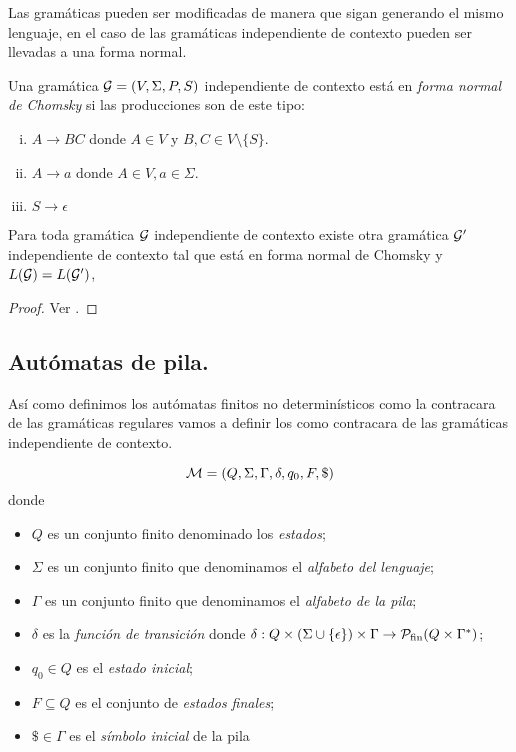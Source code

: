 \documentclass[tesis.tex]{subfiles}
\begin{document}
Las gramáticas pueden ser modificadas de manera que sigan generando el mismo lenguaje, en el caso de las gramáticas independiente de contexto pueden ser llevadas a una forma normal.

\begin{deff}
	Una gramática ${\cal G} = (V, \Sigma, P, S)$ independiente de contexto está en \emph{forma normal de Chomsky} si las producciones son de este tipo:
	\begin{enumerate}[i)]
		\item $A \to BC$ donde $A\in V$ y $B,C \in V \setminus \{ S \}$.
		\item $A \to a$ donde $A \in V, a \in \Sigma$.
		\item $S \to \epsilon$ 
	\end{enumerate}
\end{deff}

\begin{prop}\label{prop_fn_Chomsky}
	Para toda gramática $\cal G$ independiente de contexto existe otra gramática $\cal G'$ independiente de contexto tal que está en forma normal de Chomsky y $L({\cal G}) = L(\cal G')$,
\end{prop}

\begin{proof}
	Ver \cite[pp.274-275]{hopcraft-ullman}.
\end{proof}





\subsection{Autómatas de pila.}
Así como definimos los autómatas finitos no determinísticos como la contracara de las gramáticas regulares vamos a definir los \APND como contracara de las gramáticas independiente de contexto.

\begin{deff}\label{deff_apnd}
	\[
	{\cal M } = (Q, \Sigma, \Gamma, \delta, q_0, F, \$)
	\]
	donde 
	\begin{itemize}
		\item $Q$ es un conjunto finito denominado los \emph{estados};
		\item $\Sigma$ es un conjunto finito que denominamos el \emph{alfabeto del lenguaje};
		\item $\Gamma$ es un conjunto finito que denominamos el \emph{alfabeto de la pila};
		\item $\delta$ es la \emph{función de transición} donde $\delta: Q  \times (\Sigma \cup \{ \epsilon \}) \times \Gamma \to {\cal P}_{\textrm{fin}}( Q  \times \Gamma^*)$;
		\item $q_0 \in Q$ es el \emph{estado inicial};
		\item $F \subseteq Q$ es el conjunto de \emph{estados finales};
		\item $\$ \in \Gamma$ es el \emph{símbolo inicial} de la pila
	\end{itemize}
\end{deff}
\end{document}

